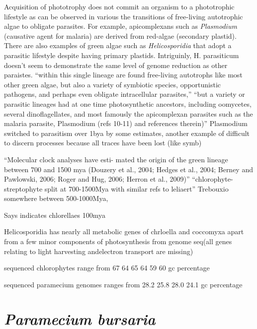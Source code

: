 Acquisition of phototrophy does not commit an organism to a phototrophic lifestyle
as can be observed in various the transitions of free-living autotrophic algae 
to obligate parasites.  For example, apicomplexans such as \textit{Plasmodium} 
(causative agent for malaria) are derived from red-algae (secondary plastid).
There are also examples of green algae such as \textit{Helicosporidia} that 
adopt a parasitic lifestyle despite having primary plastids. 
Intriguinly, H. parasiticum doesn't seem to demonstrate the same level of
genome reduction as other paraistes.\citep{Pombert2014}
``within this single lineage are found free-living autotrophs like most
other green algae, but also a variety of symbiotic species,
opportunistic pathogens, and perhaps even obligate intracellular
parasites,''
``but a variety or parasitic lineages
had at one time photosynthetic ancestors, including oomycetes,
several dinoflagellates, and most famously the apicomplexan
parasites such as the malaria parasite, Plasmodium (refs 10-11)
and references therein)''
\citep{Pombert2014}
Plasmodium switched to parasitism over 1bya by some estimates, another example
of difficult to discern processes because all traces have been lost (like symb)



``Molecular clock analyses have esti- mated the origin of the green lineage between 700 and 1500 mya (Douzery et al., 2004; Hedges et al., 2004; Berney and Pawlowski, 2006; Roger and Hug, 2006; Herron et al., 2009)''
\citep{Leliaert2012}
``chlorophyte-streptophyte split at 700-1500Mya with similar refs to leliaert'' \citep{DeWever2009}
Trebouxio somewhere between 500-1000Mya, \citep{DeWever2009}



Says \citep{DeWever2009} indicates chlorellaes 100mya \citep{Pombert2014}

Helicosporidia has nearly all metabolic genes of chrloella and coccomyxa apart from
a few minor components of photosynthesis \citep{Pombert2014} from genome seq(all genes relating to light harvesting andelectron transport are missing)




sequenced chlorophytes range from  67 64 65 64 59 60 gc percentage \citep{Blanc2010a}

sequenced paramecium genomes ranges from 28.2 25.8 28.0 24.1 gc percentage \citep{McGrath2014}

\section{\textit{Paramecium bursaria}}




